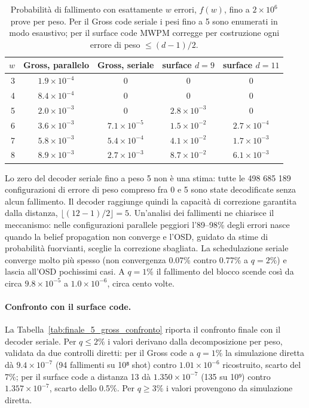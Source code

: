 \begin{table}[H]
\centering
\small
\caption{Probabilità di fallimento con esattamente \(w\) errori, \(f(w)\), fino a \(2\times10^{6}\) prove per peso. Per il Gross code seriale i pesi fino a 5 sono enumerati in modo esaustivo; per il surface code MWPM corregge per costruzione ogni errore di peso \(\le (d-1)/2\).}
\label{tab:finale_5_gross_fw}
\begin{tabular}{@{}rcccc@{}}
\toprule
\(w\) & Gross, parallelo & Gross, seriale & surface \(d=9\) & surface \(d=11\) \\
\midrule
3 & \(1.9\times10^{-4}\) & 0 & 0 & 0 \\
4 & \(8.4\times10^{-4}\) & 0 & 0 & 0 \\
5 & \(2.0\times10^{-3}\) & 0 & \(2.8\times10^{-3}\) & 0 \\
6 & \(3.6\times10^{-3}\) & \(7.1\times10^{-5}\) & \(1.5\times10^{-2}\) & \(2.7\times10^{-4}\) \\
7 & \(5.8\times10^{-3}\) & \(5.4\times10^{-4}\) & \(4.1\times10^{-2}\) & \(1.7\times10^{-3}\) \\
8 & \(8.9\times10^{-3}\) & \(2.7\times10^{-3}\) & \(8.7\times10^{-2}\) & \(6.1\times10^{-3}\) \\
\bottomrule
\end{tabular}
\end{table}

Lo zero del decoder seriale fino a peso 5 non è una stima: tutte le 498 685 189 configurazioni di errore di peso compreso fra 0 e 5 sono state decodificate senza alcun fallimento. Il decoder raggiunge quindi la capacità di correzione garantita dalla distanza, \(\lfloor(12-1)/2\rfloor = 5\). Un'analisi dei fallimenti ne chiarisce il meccanismo: nelle configurazioni parallele peggiori l'89--98\% degli errori nasce quando la belief propagation non converge e l'OSD, guidato da stime di probabilità fuorvianti, sceglie la correzione sbagliata. La schedulazione seriale converge molto più spesso (non convergenza 0.07\% contro 0.77\% a \(q = 2\%\)) e lascia all'OSD pochissimi casi. A \(q = 1\%\) il fallimento del blocco scende così da circa \(9.8\times10^{-5}\) a \(1.0\times10^{-6}\), circa cento volte.

\paragraph{Confronto con il surface code.} La Tabella~\ref{tab:finale_5_gross_confronto} riporta il confronto finale con il decoder seriale. Per \(q \le 2\%\) i valori derivano dalla decomposizione per peso, validata da due controlli diretti: per il Gross code a \(q = 1\%\) la simulazione diretta dà \(9.4\times10^{-7}\) (94 fallimenti su 10⁸ shot) contro \(1.01\times10^{-6}\) ricostruito, scarto del 7\%; per il surface code a distanza 13 dà \(1.350\times10^{-7}\) (135 su 10⁹) contro \(1.357\times10^{-7}\), scarto dello 0.5\%. Per \(q \ge 3\%\) i valori provengono da simulazione diretta.

